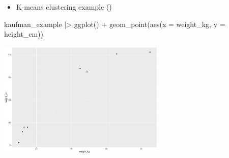 \documentclass[
  ignorenonframetext,
]{beamer}
\newenvironment{Shaded}{\begin{snugshade}}{\end{snugshade}}
\newcommand{\AttributeTok}[1]{\textcolor[rgb]{0.40,0.45,0.13}{#1}}
\newcommand{\FunctionTok}[1]{\textcolor[rgb]{0.28,0.35,0.67}{#1}}
\newcommand{\NormalTok}[1]{\textcolor[rgb]{0.00,0.23,0.31}{#1}}
\newcommand{\SpecialCharTok}[1]{\textcolor[rgb]{0.37,0.37,0.37}{#1}}
\providecommand{\tightlist}{%
  \setlength{\itemsep}{0pt}\setlength{\parskip}{0pt}}\usepackage{longtable,booktabs,array}
\begin{document}
\begin{frame}[fragile]{}
\label{section-35}
\begin{itemize}
\tightlist
\item
  K-means clustering example
  ()
\end{itemize}

\tiny

\begin{Shaded}
\begin{Highlighting}[]
\NormalTok{kaufman\_example }\SpecialCharTok{|\textgreater{}} 
  \FunctionTok{ggplot}\NormalTok{() }\SpecialCharTok{+} 
  \FunctionTok{geom\_point}\NormalTok{(}\FunctionTok{aes}\NormalTok{(}\AttributeTok{x =}\NormalTok{ weight\_kg, }\AttributeTok{y =}\NormalTok{ height\_cm))}
\end{Highlighting}
\end{Shaded}

\begin{center}
\includegraphics[width=0.6\textwidth,height=\textheight]{011_segmentation_clustering_files/figure-beamer/unnamed-chunk-25-1.pdf}
\end{center}
\end{frame}
\end{document}
